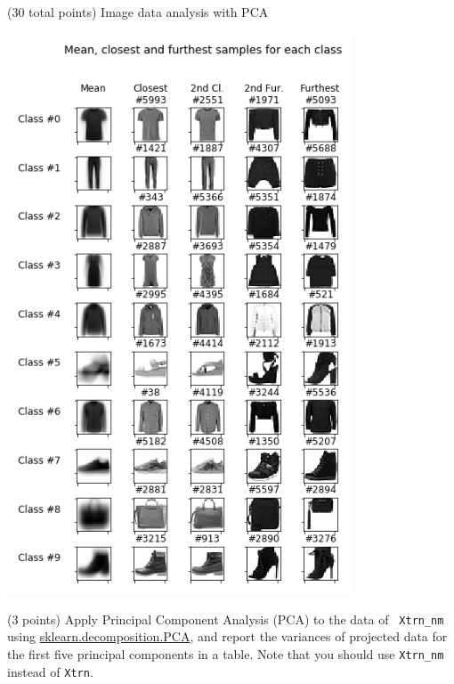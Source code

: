 \documentclass[12pt]{article}
\begin{document}
\begin{question}{(30 total points) Image data analysis with PCA}
\begin{subquestion}
  \begin{answerbox}{52em}
    \begin{center}
	\includegraphics[width=0.77\textwidth]{imgs/1_2.png}
	\end{center}
  \end{answerbox}



   \end{subquestion}

   \begin{subquestion}{(3 points)
       Apply Principal Component Analysis (PCA) to the data of {\tt
         Xtrn\_nm} using
       \href{https://scikit-learn.org/0.19/modules/generated/sklearn.decomposition.PCA.html}{sklearn.decomposition.PCA},
       and report the variances of projected data for the first five principal
       components in a table. 
       Note that you should use {\tt Xtrn\_nm} instead of {\tt Xtrn}.
           } \label{Q1.pca.variance}




\end{subquestion}
\end{question}
\end{document}
